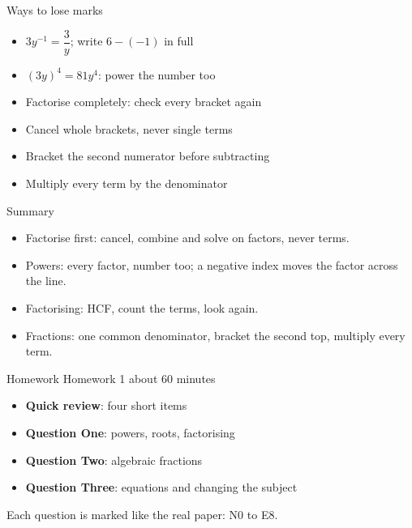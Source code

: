 \documentclass[aspectratio=169,11pt,xcolor=table,t]{beamer}
\newcommand\hp[1]{\fref{Handout p.\pageref{H-#1}}}
\begin{document}
\begin{frame}{Ways to lose marks}
\relax
\begin{itemize}
\item \textbf{} $3y^{-1} = \dfrac{3}{y}$; write $6-(-1)$ in full
\item \textbf{} $(3y)^{4} = 81y^{4}$: power the number too
\item \textbf{} Factorise completely: check every bracket again
\item \textbf{} Cancel whole brackets, never single terms
\item \textbf{} Bracket the second numerator before subtracting
\item \textbf{} Multiply every term by the denominator
\end{itemize}
\hp{h:lose}
\end{frame}

\begin{frame}{Summary}
\relax
\begin{itemize}
\item Factorise first: cancel, combine and solve on factors, never terms.
\item Powers: every factor, number too; a negative index moves the factor across the line.
\item Factorising: HCF, count the terms, look again.
\item Fractions: one common denominator, bracket the second top, multiply every term.
\end{itemize}
\hp{h:indices}
\end{frame}

\begin{frame}{Homework}
\relax
Homework 1 \textperiodcentered{} about 60 minutes
\begin{itemize}
\item \textbf{Quick review}: four short items
\item \textbf{Question One}: powers, roots, factorising
\item \textbf{Question Two}: algebraic fractions
\item \textbf{Question Three}: equations and changing the subject
\end{itemize}
Each question is marked like the real paper: N0 to E8.
\end{frame}
\end{document}
